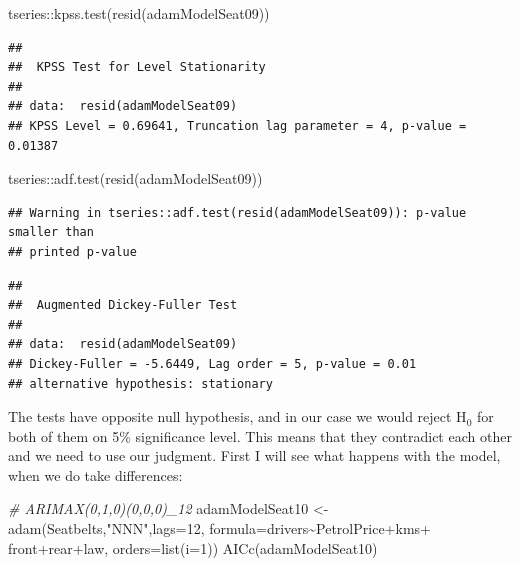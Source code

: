 \documentclass[
]{book}
\newenvironment{Shaded}{\begin{snugshade}}{\end{snugshade}}
\newcommand{\AttributeTok}[1]{\textcolor[rgb]{0.77,0.63,0.00}{#1}}
\newcommand{\CommentTok}[1]{\textcolor[rgb]{0.56,0.35,0.01}{\textit{#1}}}
\newcommand{\DecValTok}[1]{\textcolor[rgb]{0.00,0.00,0.81}{#1}}
\newcommand{\FunctionTok}[1]{\textcolor[rgb]{0.00,0.00,0.00}{#1}}
\newcommand{\NormalTok}[1]{#1}
\newcommand{\OtherTok}[1]{\textcolor[rgb]{0.56,0.35,0.01}{#1}}
\newcommand{\SpecialCharTok}[1]{\textcolor[rgb]{0.00,0.00,0.00}{#1}}
\newcommand{\StringTok}[1]{\textcolor[rgb]{0.31,0.60,0.02}{#1}}
\theoremstyle{definition}
\theoremstyle{definition}
\theoremstyle{definition}
\theoremstyle{definition}
\theoremstyle{remark}
\begin{document}
\begin{Shaded}
\begin{Highlighting}[]
\NormalTok{tseries}\SpecialCharTok{::}\FunctionTok{kpss.test}\NormalTok{(}\FunctionTok{resid}\NormalTok{(adamModelSeat09))}
\end{Highlighting}
\end{Shaded}

\begin{verbatim}
## 
##  KPSS Test for Level Stationarity
## 
## data:  resid(adamModelSeat09)
## KPSS Level = 0.69641, Truncation lag parameter = 4, p-value = 0.01387
\end{verbatim}

\begin{Shaded}
\begin{Highlighting}[]
\NormalTok{tseries}\SpecialCharTok{::}\FunctionTok{adf.test}\NormalTok{(}\FunctionTok{resid}\NormalTok{(adamModelSeat09))}
\end{Highlighting}
\end{Shaded}

\begin{verbatim}
## Warning in tseries::adf.test(resid(adamModelSeat09)): p-value smaller than
## printed p-value
\end{verbatim}

\begin{verbatim}
## 
##  Augmented Dickey-Fuller Test
## 
## data:  resid(adamModelSeat09)
## Dickey-Fuller = -5.6449, Lag order = 5, p-value = 0.01
## alternative hypothesis: stationary
\end{verbatim}

The tests have opposite null hypothesis, and in our case we would reject H\(_0\) for both of them on 5\% significance level. This means that they contradict each other and we need to use our judgment. First I will see what happens with the model, when we do take differences:

\begin{Shaded}
\begin{Highlighting}[]
\CommentTok{\# ARIMAX(0,1,0)(0,0,0)\_12}
\NormalTok{adamModelSeat10 }\OtherTok{\textless{}{-}} \FunctionTok{adam}\NormalTok{(Seatbelts,}\StringTok{"NNN"}\NormalTok{,}\AttributeTok{lags=}\DecValTok{12}\NormalTok{,}
                        \AttributeTok{formula=}\NormalTok{drivers}\SpecialCharTok{\textasciitilde{}}\NormalTok{PetrolPrice}\SpecialCharTok{+}\NormalTok{kms}\SpecialCharTok{+}
\NormalTok{                          front}\SpecialCharTok{+}\NormalTok{rear}\SpecialCharTok{+}\NormalTok{law,}
                        \AttributeTok{orders=}\FunctionTok{list}\NormalTok{(}\AttributeTok{i=}\DecValTok{1}\NormalTok{))}
\FunctionTok{AICc}\NormalTok{(adamModelSeat10)}
\end{Highlighting}
\end{Shaded}
\end{document}

